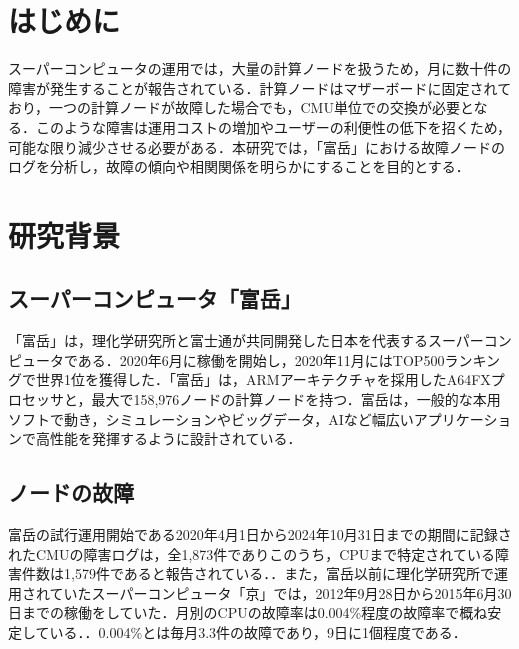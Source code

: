 \documentclass[a4paper,11pt,twocolumn]{jsarticle}
\begin{document}

\section{はじめに}
スーパーコンピュータの運用では，大量の計算ノードを扱うため，月に数十件の障害が発生することが報告されている\cite{ref:1}．計算ノードはマザーボードに固定されており，一つの計算ノードが故障した場合でも，CMU単位での交換が必要となる\cite{ref:2}．このような障害は運用コストの増加やユーザーの利便性の低下を招くため，可能な限り減少させる必要がある．本研究では，「富岳」における故障ノードのログを分析し，故障の傾向や相関関係を明らかにすることを目的とする．


\section{研究背景}

\subsection{スーパーコンピュータ「富岳」}\label{sec:fugaku}
「富岳」は，理化学研究所と富士通が共同開発した日本を代表するスーパーコンピュータである．2020年6月に稼働を開始し，2020年11月にはTOP500ランキングで世界1位を獲得した\cite{ref:3}．「富岳」は，ARMアーキテクチャを採用したA64FXプロセッサと，最大で158,976ノードの計算ノードを持つ\cite{ref:4}．富岳は，一般的な本用ソフトで動き，シミュレーションやビッグデータ，AIなど幅広いアプリケーションで高性能を発揮するように設計されている．

\subsection{ノードの故障}
富岳の試行運用開始である2020年4月1日から2024年10月31日までの期間に記録されたCMUの障害ログは，全1,873件でありこのうち，CPUまで特定されている障害件数は1,579件であると報告されている．\cite{ref:5}．また，富岳以前に理化学研究所で運用されていたスーパーコンピュータ「京」では，2012年9月28日から2015年6月30日までの稼働をしていた．月別のCPUの故障率は0.004\%程度の故障率で概ね安定している．\cite{ref:6}．0.004\%とは毎月3.3件の故障であり，9日に1個程度である．
\end{document}
